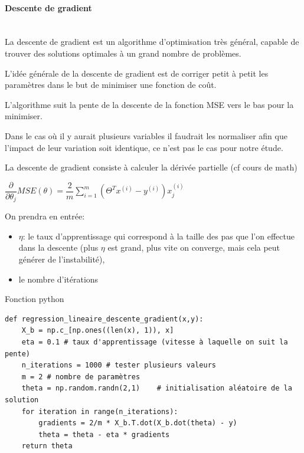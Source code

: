 \paragraph{Descente de gradient} ~\ \\

La descente de gradient est un algorithme d'optimisation très général, capable de trouver des solutions optimales à un grand nombre de problèmes. 

L'idée générale de la descente de gradient est de corriger petit à petit les paramètres dans le but de minimiser une fonction de coût.

L'algorithme suit la pente de la descente de la fonction MSE vers le bas pour la minimiser.

Dans le cas où il y aurait plusieurs variables il faudrait les normaliser afin que l'impact de leur variation soit identique, ce n'est pas le cas pour notre étude.

La descente de gradient consiste à calculer la dérivée partielle (cf cours de math)
\begin{center}
$\dfrac{\partial}{\partial \theta_j}MSE(\theta)=\dfrac{2}{m}\sum\limits_{i=1}^m (\Theta^T x^{(i)}-y^{(i)})x_j^{(i)}$
\end{center}

On prendra en entrée:
\begin{itemize}
 \item $\eta$: le taux d'apprentissage qui correspond à la taille des pas que l'on effectue dans la descente (plus $\eta$ est grand, plus vite on converge, mais cela peut générer de l'instabilité),
 \item le nombre d'itérations
\end{itemize}

Fonction python
\begin{lstlisting}
def regression_lineaire_descente_gradient(x,y):
    X_b = np.c_[np.ones((len(x), 1)), x]
    eta = 0.1 # taux d'apprentissage (vitesse à laquelle on suit la pente)
    n_iterations = 1000 # tester plusieurs valeurs
    m = 2 # nombre de paramètres
    theta = np.random.randn(2,1)    # initialisation aléatoire de la solution
    for iteration in range(n_iterations):
        gradients = 2/m * X_b.T.dot(X_b.dot(theta) - y)
        theta = theta - eta * gradients
    return theta
\end{lstlisting}

\ifdef{\public}{}{}

\clearpage

\newpage

